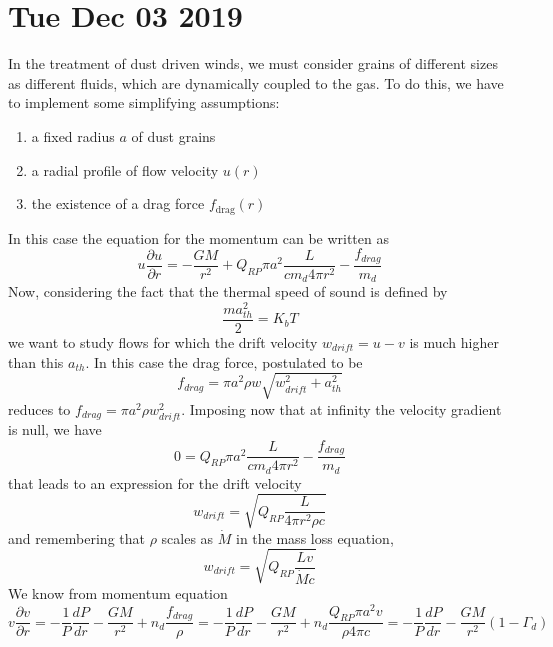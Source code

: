 \documentclass[main.tex]{subfiles}
\begin{document}
\section*{Tue Dec 03 2019}


In the treatment of dust driven winds, we must consider grains of different sizes as different fluids, which are dynamically coupled to the gas.
To do this, we have to implement some simplifying assumptions:
\begin{enumerate}
    \item a fixed radius $a$ of dust grains
    \item a radial profile of flow velocity $u(r)$
    \item the existence of a drag force $f_{\text{drag}}(r)$
\end{enumerate}
In this case the equation for the momentum can be written as
\begin{equation}
    u \frac{\partial u}{\partial r}=-\frac{GM}{r^2}+Q_{RP}\pi a^2 \frac{L}{c m_d 4\pi r^2}-\frac{f_{drag}}{m_d}
\end{equation}
Now, considering the fact that the thermal speed of sound is defined by
\begin{equation}
    \frac{m a_{th}^2}{2}=K_b T
\end{equation}
we want to study flows for which the drift velocity $w_{drift}=u-v$ is much higher than this $a_{th}$. In this case the drag force, postulated to be
\begin{equation}
    f_{drag}=\pi a^2\rho w \sqrt{w_{drift}^2+a_{th}^2}
\end{equation}
reduces to $f_{drag}=\pi a^2\rho w_{drift}^2$.
Imposing now that at infinity the velocity gradient is null, we have
\begin{equation}
    0=Q_{RP}\pi a^2 \frac{L}{c m_d 4\pi r^2}-\frac{f_{drag}}{m_d}
\end{equation}
that leads to an expression for the drift velocity
\begin{equation}
    w_{drift}=\sqrt{Q_{RP}\frac{L}{4\pi r^2\rho c}}
\end{equation}
and remembering that $\rho$ scales as $\dot M$ in the mass loss equation,
\begin{equation}
    w_{drift}=\sqrt{Q_{RP}\frac{L v}{\dot M c}}
\end{equation}
We know from momentum equation
\begin{equation}
    v \frac{\partial v}{\partial r}=-\frac{1}{P}\frac{d P}{d r}-\frac{GM}{r^2}+n_d\frac{f_{drag}}{\rho}= -\frac{1}{P}\frac{d P}{d r}-\frac{GM}{r^2}+n_d\frac{Q_{RP}\pi a^2 v}{\rho 4\pi c}=-\frac{1}{P}\frac{d P}{d r}-\frac{GM}{r^2}(1-\Gamma_d)
\end{equation}
\end{document}
